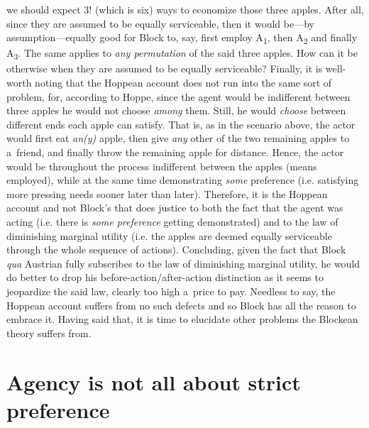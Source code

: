  we should expect 3! (which is six) ways to economize those three apples. After all, since they are assumed to be equally serviceable, then it would be---by assumption---equally good for Block to, say, first employ A\textsubscript{1}, then A\textsubscript{2} and finally A\textsubscript{3}. The same applies to \textit{any permutation} of the said three apples. How can it be otherwise when they are assumed to be equally serviceable? Finally, it is well-worth noting that the Hoppean account does not run into the same sort of problem, for, according to Hoppe, since the agent would be indifferent between three apples he would not choose \textit{among} them. Still, he would \textit{choose} between different ends each apple can satisfy. That is, as in the scenario above, the actor would first eat \textit{an(y)} apple, then give \textit{any} other of the two remaining apples to a~friend, and finally throw the remaining apple for distance. Hence, the actor would be throughout the process indifferent between the apples (means employed), while at the same time demonstrating \textit{some} preference (i.e. satisfying more pressing needs sooner later than later). Therefore, it is the Hoppean account and not Block's that does justice to both the fact that the agent was acting (i.e. there is \textit{some preference} getting demonstrated) and to the law of diminishing marginal utility (i.e. the apples are deemed equally serviceable through the whole sequence of actions). Concluding, given the fact that Block \textit{qua} Austrian fully subscribes to the law of diminishing marginal utility, he would do better to drop his before-action/after-action distinction as it seems to jeopardize the said law, clearly too high a~price to pay. Needless to say, the Hoppean account suffers from no such defects and so Block has all the reason to embrace it. Having said that, it is time to elucidate other problems the Blockean theory suffers from.



\section{Agency is not all about strict preference}

